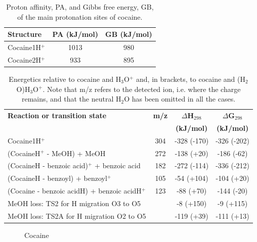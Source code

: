 \begin{table}%
\centering
\caption{Proton affinity, PA, and Gibbs free energy, GB, of the main protonation sites of cocaine.}
\label{tb:co1}
\begin{tabular}{lcc}
\toprule
\textbf{Structure} &\textbf{PA (kJ/mol)} &\textbf{GB (kJ/mol)}\\ \toprule
Cocaine1H$^+$  & 1013 &   980    \\
Cocaine2H$^+$  &933 &   895    \\
\bottomrule
\end{tabular}
\end{table}

\begin{table}%
\centering
\caption[Energetics relative to cocaine and H$_3$O$^+$.]{Energetics relative to cocaine and H$_3$O$^+$ and, in brackets, to cocaine and (H$_2$O)H$_3$O$^+$. Note that m/z refers to the detected ion, i.e. where the charge remains, and that the neutral H$_2$O has been omitted in all the cases.}
\label{tb:co2}
\begin{tabular}{lccc}
\toprule
\textbf{Reaction or transition state}	&\textbf{m/z} &\textbf{$\Delta$H$_{298}$} &\textbf{$\Delta$G$_{298}$}\\
& &	\textbf{(kJ/mol)} &\textbf{(kJ/mol)} \\  \toprule
Cocaine1H$^+$  				&	304	& -328 (-170)  & -326 (-202)   \\ \midrule
(CocaineH$^+$ - MeOH) + MeOH   			&	272	& -138 (+20)	&-186 (-62)   \\ \midrule
(CocaineH - benzoic acid)$^+$ + benzoic acid &	182 & -272 (-114)  & -336 (-212)  \\ \midrule
(CocaineH - benzoyl) + benzoyl$^+$    	&	105	& -54 (+104)  & -104 (+20)  \\ \midrule
(Cocaine - benzoic acidH) + benzoic acidH$^+$& 123	& -88 (+70)  & -144  (-20) \\ \midrule
MeOH loss: TS2 for H migration O3 to O5& & -8 (+150)  & -9 (+115)  \\ \midrule
MeOH loss: TS2A for H migration O2 to O5& & -119 (+39)  & -111  (+13) \\ 
\bottomrule
\end{tabular}
\end{table}



\begin{figure}%
\centering
{}\label{fig:coc}
\caption{Cocaine}
\end{figure}

